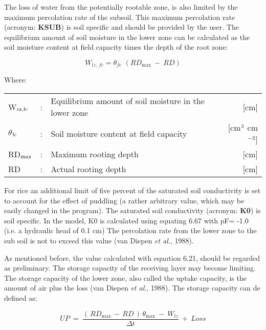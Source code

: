 The loss of water from the potentially rootable zone, is also limited by the maximum
percolation rate of the subsoil. This maximum percolation rate (acronym: {\bf KSUB}) is soil
specific and should be provided by the user. The equilibrium amount of soil moisture in
the lower zone can be calculated as the soil moisture content at field capacity times the
depth of the root zone:

\begin{equation}
W_{lz,\, fc} = \theta_{fc} \,\, (RD_{\max} ~-~RD)
\end{equation}

Where:\\
\begin{tabularx}{\textwidth}{llXr}
W$_{{\rm rz,fc}}$ &:& Equilibrium amount of soil moisture in the lower zone  & [cm]\\
$\theta$$_{{\rm fc}}$ &:& Soil moisture content at field capacity  & [cm$^{{\rm 3}}$ cm$^{{\rm -3}}$]\\
RD$_{{\rm max}}$ &:& Maximum rooting depth  & [cm]\\
RD &:& Actual rooting depth  & [cm]\\
\end{tabularx}

For rice an addi\-tional limit of five percent of the saturated soil conductivity is set to
account for the effect of puddling (a rather arbitrary value, which may be easily changed
in the program). The saturated soil conductivity (acronym: {\bf K0}) is soil specific. In the
model, K0 is calculated using equating 6.67 with pF= -1.0 (i.e. a hydraulic head of 0.1
cm) The percolation rate from the lower zone to the sub soil is not to exceed this value
(van Diepen {\it et al\/}., 1988). 

As mentioned before, the value calculated with equation 6.21, should be regarded as
preliminary. The storage capacity of the receiving layer may become limiting. The
storage capacity of the lower zone, also called the uptake capacity, is the amount of air
plus the loss (van Diepen {\it et al\/}., 1988). The storage capacity can de defined as:

\begin{equation}
UP  ~=~{\frac{(\, RD _{\max } \, -\, RD\, )\, \theta  _{\max } ~-~ W _{lz} }{\Delta t}} ~+~ Loss
\end{equation}

